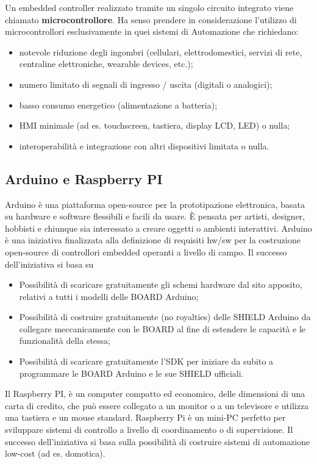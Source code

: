 \documentclass[10pt, letterpaper]{report}
\begin{document}
 Un embedded controller realizzato tramite un singolo circuito integrato viene
chiamato \textbf{microcontrollore}.
Ha senso prendere in considerazione l'utilizzo di microcontrollori esclusivamente in quei
sistemi di Automazione che richiedano:\begin{itemize}
\item notevole riduzione degli ingombri (cellulari, elettrodomestici, servizi di rete,
centraline elettroniche, wearable devices, etc.);
\item numero limitato di segnali di ingresso / uscita (digitali o analogici);
\item basso consumo energetico (alimentazione a batteria);
\item HMI minimale (ad es. touchscreen, tastiera, display LCD, LED) o nulla;
\item interoperabilità e integrazione con altri dispositivi limitata o nulla.
\end{itemize}
\subsection{Arduino e Raspberry PI}
Arduino è una piattaforma open-source per la prototipazione elettronica, basata su hardware e software flessibili e facili da usare.
È pensata per artisti, designer, hobbisti e chiunque sia interessato a creare oggetti o ambienti interattivi.
Arduino è una iniziativa finalizzata alla definizione di requisiti hw/sw per la costruzione
open-source di controllori embedded operanti a livello di campo.
Il successo dell'iniziativa si basa su\begin{itemize}
   
    \item  Possibilità di scaricare gratuitamente gli schemi hardware dal sito apposito, relativi a tutti i modelli delle BOARD Arduino;
\item  Possibilità di costruire gratuitamente (no royalties) delle SHIELD Arduino
da collegare meccanicamente con le BOARD al fine di estendere le capacità e
le funzionalità della stessa;
\item Possibilità di scaricare gratuitamente l'SDK per iniziare da subito a
programmare le BOARD Arduino e le sue SHIELD ufficiali.
\end{itemize}
Il Raspberry PI, è un computer compatto ed economico, delle dimensioni di una carta di credito, che può essere collegato a un monitor o a un televisore e utilizza una tastiera e un mouse standard. Raspberry Pi è un mini-PC perfetto per sviluppare sistemi di controllo a livello di
coordinamento o di supervisione.
Il successo dell'iniziativa si basa sulla possibilità di costruire sistemi di automazione
low-cost (ad es. domotica).\flowerLine 
\end{document}
